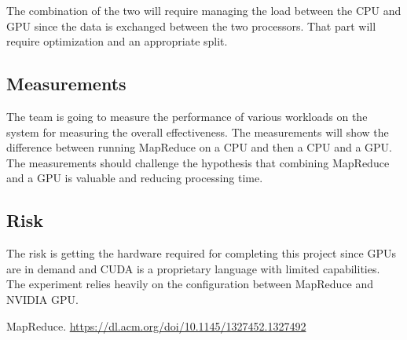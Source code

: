 \documentclass{article}
\begin{document}
The combination of the two will require managing the load between the CPU and GPU since the data is exchanged between the two processors. That part will require optimization and an appropriate split.

\subsection{Measurements}
The team is going to measure the performance of various workloads on the system for measuring the overall effectiveness. The measurements will show the difference between running MapReduce on a CPU and then a CPU and a GPU. The measurements should challenge the hypothesis that combining MapReduce and a GPU is valuable and reducing processing time. 

\subsection{Risk}
The risk is getting the hardware required for completing this project since GPUs are in demand and CUDA is a proprietary language with limited capabilities. The experiment relies heavily on the configuration between MapReduce and NVIDIA GPU. 

\begin{thebibliography}{}
\raggedright

MapReduce.
\href{https://dl.acm.org/doi/10.1145/1327452.1327492}{https://dl.acm.org/doi/10.1145/1327452.1327492}

\end{thebibliography}
\end{document}
